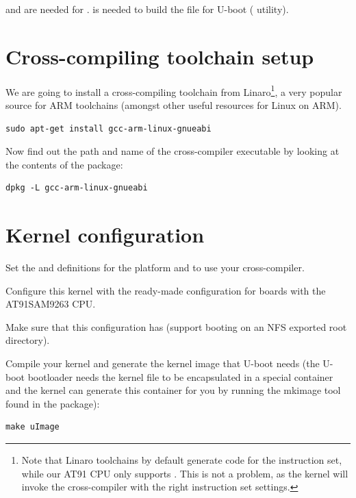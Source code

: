  and  are needed for .
 is needed to build the  file for
U-boot ( utility).

\section{Cross-compiling toolchain setup}

We are going to install a cross-compiling toolchain from
Linaro\footnote{Note that Linaro toolchains by default generate code
for the  instruction set, while our AT91 CPU only supports
. This is not a problem, as the kernel  will
invoke the cross-compiler with the right instruction set settings.}, a
very popular source for ARM toolchains (amongst other useful resources
for Linux on ARM).

\begin{verbatim}
sudo apt-get install gcc-arm-linux-gnueabi
\end{verbatim}

Now find out the path and name of the cross-compiler executable by looking at the contents of the package:

\begin{verbatim}
dpkg -L gcc-arm-linux-gnueabi
\end{verbatim}

\section{Kernel configuration}

Set the  and  definitions for the 
platform and to use your cross-compiler.

Configure this kernel with the ready-made configuration for boards
with the AT91SAM9263 CPU.

Make sure that this configuration has  (support
booting on an NFS exported root directory).

Compile your kernel and generate the  kernel image that U-boot
needs (the U-boot bootloader needs the kernel  file to be
encapsulated in a special container and the kernel  can
generate this container for you by running the mkimage tool found in
the  package):

\begin{verbatim}
make uImage
\end{verbatim}


